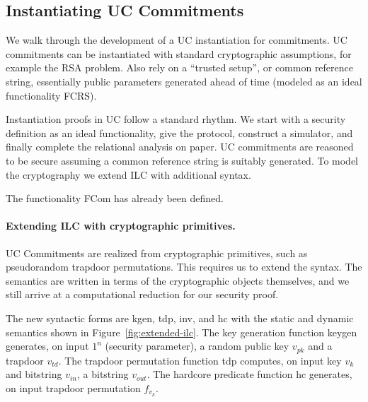 \subsection{Instantiating UC Commitments}
\label{subsec:example}
We walk through the development of a UC instantiation for commitments.  UC
commitments can be instantiated with standard cryptographic assumptions, for
example the RSA problem.  Also rely on a ``trusted setup'', or common reference
string, essentially public parameters generated ahead of time (modeled as an
ideal functionality FCRS).

Instantiation proofs in UC follow a standard rhythm. We start with a security
definition as an ideal functionality, give the protocol, construct a simulator,
and finally complete the relational analysis on paper.  UC commitments are
reasoned to be secure assuming a common reference string is suitably generated.
To model the cryptography we extend ILC with additional syntax.

The functionality FCom has already been defined.

\paragraph{Extending ILC with cryptographic primitives.}
UC Commitments are realized from cryptographic primitives, such as pseudorandom
trapdoor permutations. This requires us to extend the syntax. The semantics are
written in terms of the cryptographic objects themselves, and we still arrive at
a computational reduction for our security proof.

The new syntactic forms are \textsf{kgen}, \textsf{tdp}, \textsf{inv}, and
\textsf{hc} with the static and dynamic semantics shown in
Figure~\ref{fig:extended-ilc}. The key generation function \textsf{keygen}
generates, on input $1^n$ (security parameter), a random public key $v_{pk}$ and
a trapdoor $v_{td}$. The trapdoor permutation function \textsf{tdp} computes, on
input key $v_k$ and bitstring $v_{in}$, a bitstring $v_{out}$. The hardcore
predicate function \textsf{hc} generates, on input trapdoor permutation
$f_{v_k}$.



